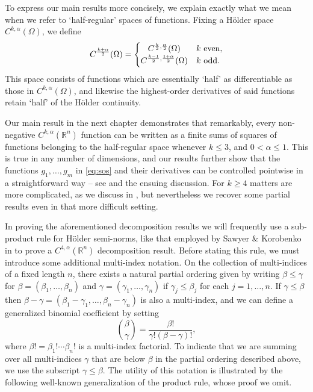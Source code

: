 \documentclass[oneside,hidelinks,indentfirst,10pt]{book}
\begin{document}
To express our main results more concisely, we explain exactly what we mean when we refer to `half-regular' spaces of functions. Fixing a H\"older space \(C^{k,\alpha}(\Omega)\), we define
\begin{equation}\label{eq:rootspaces}
    C^{\frac{k+\alpha}{2}}(\Omega)=\begin{cases}
    \hfil C^{\frac{k}{2},\frac{\alpha}{2}}(\Omega) & k\textrm{ even},\\
    C^{\frac{k-1}{2},\frac{1+\alpha}{2}}(\Omega) & k\textrm{ odd}.
    \end{cases}
\end{equation}
This space consists of functions which are essentially `half' as differentiable as those in \(C^{k,\alpha}(\Omega)\), and likewise the highest-order derivatives of said functions retain `half' of the H\"older continuity.


Our main result in the next chapter demonstrates that remarkably, every non-negative \(C^{k,\alpha}(\mathbb{R}^n)\) function can be written as a finite sums of squares of functions belonging to the half-regular space whenever \(k\leq 3\), and \(0<\alpha\leq 1\). This is true in any number of dimensions, and our results further show that the functions \(g_1,\dots,g_m\) in \eqref{eq:sos} and their derivatives can be controlled pointwise in a straightforward way -- see  and the ensuing discussion. For \(k\geq 4\) matters are more complicated, as we discuss in , but nevertheless we recover some partial results even in that more difficult setting.


In proving the aforementioned decomposition results we will frequently use a sub-product rule for H\"older semi-norms, like that employed by Sawyer \& Korobenko in \cite[Eq. (3.10)]{SOS_I} to prove a \(C^{4,\alpha}(\mathbb{R}^n)\) decomposition result. Before stating this rule, we must introduce some additional multi-index notation. On the collection of multi-indices of a fixed length \(n\), there exists a natural partial ordering given by writing \(\beta\leq \gamma\) for \(\beta=(\beta_1,\dots,\beta_n)\) and \(\gamma=(\gamma_1,\dots,\gamma_n)\) if \(\gamma_j\leq \beta_j\) for each \(j=1,\dots,n\). If \(\gamma\leq \beta\) then \(\beta-\gamma=(\beta_1-\gamma_1,\dots,\beta_n-\gamma_n)\) is also a multi-index, and we can define a generalized binomial coefficient by setting 
\begin{equation}\label{eq:binom}
    \binom{\beta}{\gamma}=\frac{\beta!}{\gamma!(\beta-\gamma)!},
\end{equation}
where \(\beta!=\beta_1!\cdots\beta_n!\) is a multi-index factorial. To indicate that we are summing over all multi-indices \(\gamma\) that are below \(\beta\) in the partial ordering described above, we use the subscript \(\gamma\leq\beta\). The utility of this notation is illustrated by the following well-known generalization of the product rule, whose proof we omit.
\end{document}
